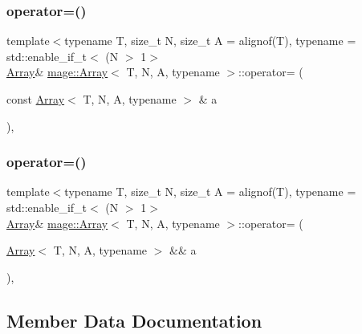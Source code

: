 \subsubsection{\texorpdfstring{operator=()}{operator=()}\hspace{0.1cm}{\footnotesize\ttfamily [1/2]}}
{\footnotesize\ttfamily template$<$typename T, size\+\_\+t N, size\+\_\+t A = alignof(\+T), typename  = std\+::enable\+\_\+if\+\_\+t$<$ (\+N $>$ 1$>$ \\
\mbox{\hyperlink{structmage_1_1_array}{Array}}\& \mbox{\hyperlink{structmage_1_1_array}{mage\+::\+Array}}$<$ T, N, A, typename $>$\+::operator= (\begin{DoxyParamCaption}\item[{const \mbox{\hyperlink{structmage_1_1_array}{Array}}$<$ T, N, A, typename $>$ \&}]{a }\end{DoxyParamCaption})\hspace{0.3cm}{\ttfamily [default]}, {\ttfamily [noexcept]}}

\mbox{\label{structmage_1_1_array_a33cb0dac90d7bf6c3973455ab12eb535}} 
\subsubsection{\texorpdfstring{operator=()}{operator=()}\hspace{0.1cm}{\footnotesize\ttfamily [2/2]}}
{\footnotesize\ttfamily template$<$typename T, size\+\_\+t N, size\+\_\+t A = alignof(\+T), typename  = std\+::enable\+\_\+if\+\_\+t$<$ (\+N $>$ 1$>$ \\
\mbox{\hyperlink{structmage_1_1_array}{Array}}\& \mbox{\hyperlink{structmage_1_1_array}{mage\+::\+Array}}$<$ T, N, A, typename $>$\+::operator= (\begin{DoxyParamCaption}\item[{\mbox{\hyperlink{structmage_1_1_array}{Array}}$<$ T, N, A, typename $>$ \&\&}]{a }\end{DoxyParamCaption})\hspace{0.3cm}{\ttfamily [default]}, {\ttfamily [noexcept]}}



\subsection{Member Data Documentation}
\mbox{\label{structmage_1_1_array_aead6104ec6173aed5755a261b0a82b82}} 
